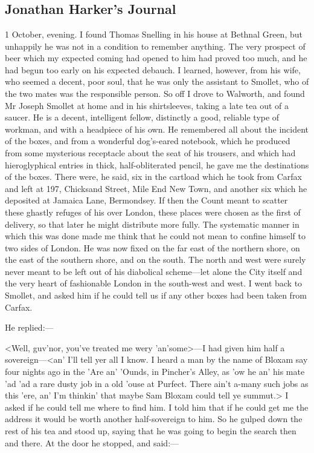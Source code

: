 \chapter[Chapter \thechapter]{}

\section{Jonathan Harker's Journal}
\begin{diary}{1 October, evening.}
I found Thomas Snelling in his house at Bethnal Green, but unhappily he was not in a condition to remember anything. The very prospect of beer which my expected coming had opened to him had proved too much, and he had begun too early on his expected debauch. I learned, however, from his wife, who seemed a decent, poor soul, that he was only the assistant to Smollet, who of the two mates was the responsible person. So off I drove to Walworth, and found Mr Joseph Smollet at home and in his shirtsleeves, taking a late tea out of a saucer. He is a decent, intelligent fellow, distinctly a good, reliable type of workman, and with a headpiece of his own. He remembered all about the incident of the boxes, and from a wonderful dog's-eared notebook, which he produced from some mysterious receptacle about the seat of his trousers, and which had hieroglyphical entries in thick, half-obliterated pencil, he gave me the destinations of the boxes. There were, he said, six in the cartload which he took from Carfax and left at 197, Chicksand Street, Mile End New Town, and another six which he deposited at Jamaica Lane, Bermondsey. If then the Count meant to scatter these ghastly refuges of his over London, these places were chosen as the first of delivery, so that later he might distribute more fully. The systematic manner in which this was done made me think that he could not mean to confine himself to two sides of London. He was now fixed on the far east of the northern shore, on the east of the southern shore, and on the south. The north and west were surely never meant to be left out of his diabolical scheme—let alone the City itself and the very heart of fashionable London in the south-west and west. I went back to Smollet, and asked him if he could tell us if any other boxes had been taken from Carfax.

He replied:—

<Well, guv'nor, you've treated me wery 'an'some>—I had given him half a sovereign—<an' I'll tell yer all I know. I heard a man by the name of Bloxam say four nights ago in the 'Are an' 'Ounds, in Pincher's Alley, as 'ow he an' his mate 'ad 'ad a rare dusty job in a old 'ouse at Purfect. There ain't a-many such jobs as this 'ere, an' I'm thinkin' that maybe Sam Bloxam could tell ye summut.> I asked if he could tell me where to find him. I told him that if he could get me the address it would be worth another half-sovereign to him. So he gulped down the rest of his tea and stood up, saying that he was going to begin the search then and there. At the door he stopped, and said:—


\end{diary}
